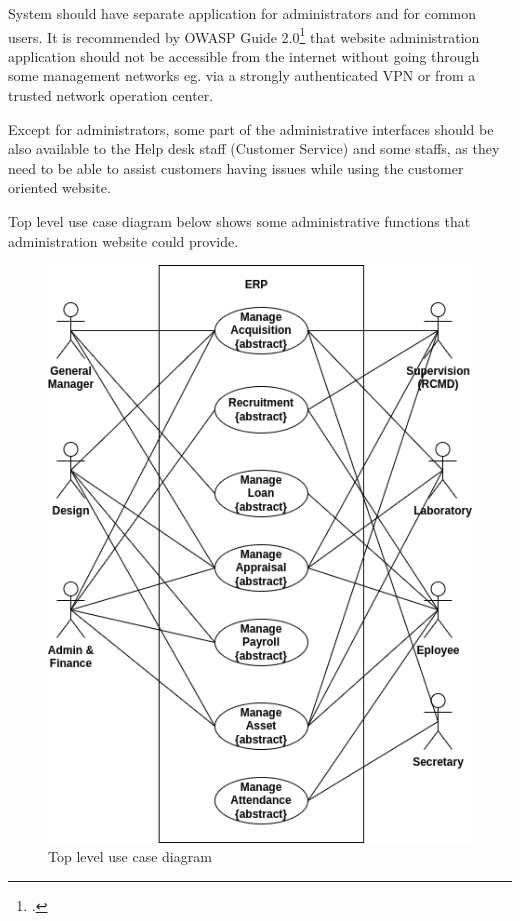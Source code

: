 System should have separate application for administrators and for common users. It is recommended by OWASP Guide 2.0\footcite{https://www.owasp.org} that website administration application should not be accessible from  the internet without going through some management networks eg. via a strongly authenticated VPN or from a trusted network operation center.

Except for administrators, some part of the administrative interfaces should be also available to the Help desk staff (Customer Service) and some staffs, as they need to be able to assist customers having issues while using the customer oriented website.

Top level use case diagram below shows some administrative functions that administration website could provide.

\begin{figure}[!hb]
\includegraphics[width=15cm,keepaspectratio]{usecases/top_level_usecase.drawio.png}
\caption{Top level use case diagram}
\end{figure}

